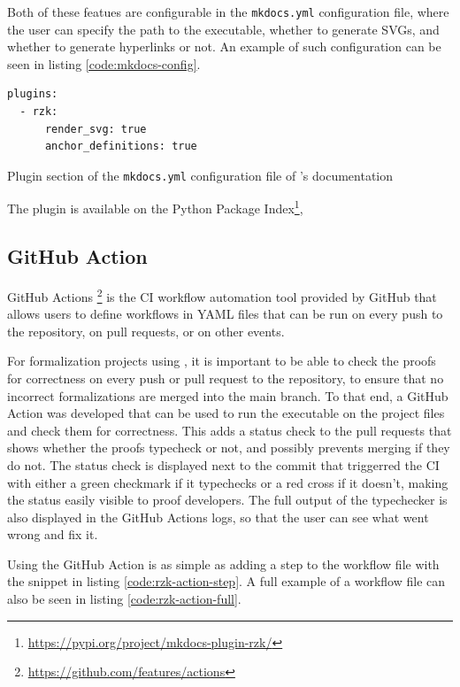 Both of these featues are configurable in the \texttt{mkdocs.yml} configuration file,
where the user can specify the path to the \Rzk{} executable, whether to generate SVGs,
and whether to generate hyperlinks or not.
An example of such configuration can be seen in listing \ref{code:mkdocs-config}.

\begin{listing}
  \begin{verbatim}
plugins:
  - rzk:
      render_svg: true
      anchor_definitions: true
  \end{verbatim}
  \caption{Plugin section of the \texttt{mkdocs.yml} configuration file of \Rzk{}'s documentation}
  \label{code:mkdocs-config}
\end{listing}

The plugin is available on the Python Package Index\footnote{
  \url{https://pypi.org/project/mkdocs-plugin-rzk/}},

\subsection{GitHub Action}

GitHub Actions \footnote{\url{https://github.com/features/actions}} is the CI workflow automation
tool provided by GitHub that allows users to define workflows in YAML files that can be run
on every push to the repository, on pull requests, or on other events.

For formalization projects using \Rzk{}, it is important to be able to check the proofs
for correctness on every push or pull request to the repository, to ensure that no incorrect
formalizations are merged into the main branch.
To that end, a GitHub Action was developed that can be used to run the \Rzk{} executable
on the project files and check them for correctness.
This adds a status check to the pull requests that shows whether the proofs typecheck or not,
and possibly prevents merging if they do not.
The status check is displayed next to the commit that triggerred the CI with either
a green checkmark if it typechecks or a red cross if it doesn't, making the status easily visible
to proof developers.
The full output of the typechecker is also displayed in the GitHub Actions logs, so that the user
can see what went wrong and fix it.

Using the GitHub Action is as simple as adding a step to the workflow file with the snippet
in listing \ref{code:rzk-action-step}.
A full example of a workflow file can also be seen in listing \ref{code:rzk-action-full}.

